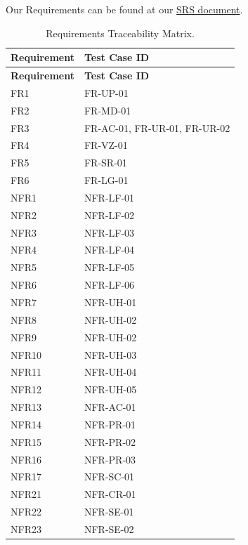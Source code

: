\documentclass[12pt, titlepage]{article}
\begin{document}
Our Requirements can be found at our \href{https://github.com/PaisWillie/Digital-Composite/blob/main/docs/SRS-Volere/SRS.pdf}{SRS document}.

\renewcommand{\arraystretch}{1.3} %
\begin{longtable}{|p{4cm}|p{8cm}|}
\caption{Requirements Traceability Matrix.} \label{tab:long} \\
    \hline
    \textbf{Requirement} & \textbf{Test Case ID} \\
    \hline
    \endfirsthead
    
    \hline
    \textbf{Requirement} & \textbf{Test Case ID} \\
    \hline
    \endhead
    
    FR1 & FR-UP-01 \\\hline
    FR2 & FR-MD-01 \\\hline
    FR3 & FR-AC-01, FR-UR-01, FR-UR-02 \\\hline
    FR4 & FR-VZ-01 \\\hline
    FR5 & FR-SR-01 \\\hline
    FR6 & FR-LG-01 \\\hline
    NFR1 & NFR-LF-01 \\\hline
    NFR2 & NFR-LF-02 \\\hline
    NFR3 & NFR-LF-03 \\\hline
    NFR4 & NFR-LF-04 \\\hline
    NFR5 & NFR-LF-05 \\\hline
    NFR6 & NFR-LF-06 \\\hline
    NFR7 & NFR-UH-01 \\\hline
    NFR8 & NFR-UH-02 \\\hline
    NFR9 & NFR-UH-02 \\\hline
    NFR10 & NFR-UH-03 \\\hline
    NFR11 & NFR-UH-04 \\\hline
    NFR12 & NFR-UH-05 \\\hline
    NFR13 & NFR-AC-01 \\\hline
    NFR14 & NFR-PR-01 \\\hline
    NFR15 & NFR-PR-02 \\\hline
    NFR16 & NFR-PR-03 \\\hline
    NFR17 & NFR-SC-01 \\\hline
    NFR21 & NFR-CR-01 \\\hline
    NFR22 & NFR-SE-01 \\\hline
    NFR23 & NFR-SE-02 \\\hline

\end{longtable}
\end{document}

